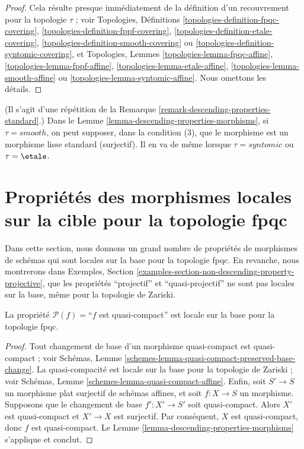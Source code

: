 \begin{proof}
Cela résulte presque immédiatement de la définition d'un recouvrement pour
la topologie $\tau$ ; voir Topologies, Définitions
\ref{topologies-definition-fpqc-covering},
\ref{topologies-definition-fppf-covering},
\ref{topologies-definition-etale-covering},
\ref{topologies-definition-smooth-covering} ou
\ref{topologies-definition-syntomic-covering}, et Topologies, Lemmes
\ref{topologies-lemma-fpqc-affine},
\ref{topologies-lemma-fppf-affine},
\ref{topologies-lemma-etale-affine},
\ref{topologies-lemma-smooth-affine} ou
\ref{topologies-lemma-syntomic-affine}. Nous omettons les détails.
\end{proof}

\begin{remark}
\label{remark-descending-properties-morphisms-standard}
(Il s'agit d'une répétition de la Remarque
\ref{remark-descending-properties-standard}.) Dans le
Lemme \ref{lemma-descending-properties-morphisms}, si $\tau = smooth$, on
peut supposer, dans la condition (3), que le morphisme est un morphisme lisse
standard (surjectif). Il en va de même lorsque $\tau = syntomic$ ou
$\tau = \etale$.
\end{remark}




\section{Propriétés des morphismes locales sur la cible pour la topologie fpqc}
\label{section-descending-properties-morphisms-fpqc}

\noindent
Dans cette section, nous donnons un grand nombre de propriétés de morphismes
de schémas qui sont locales sur la base pour la topologie fpqc. En revanche,
nous montrerons dans Exemples, Section
\ref{examples-section-non-descending-property-projective}, que les propriétés
``projectif'' et ``quasi-projectif'' ne sont pas locales sur la base, même
pour la topologie de Zariski.

\begin{lemma}
\label{lemma-descending-property-quasi-compact}
La propriété $\mathcal{P}(f) =$``$f$ est quasi-compact'' est locale sur la
base pour la topologie fpqc.
\end{lemma}

\begin{proof}
Tout changement de base d'un morphisme quasi-compact est quasi-compact ; voir
Schémas, Lemme \ref{schemes-lemma-quasi-compact-preserved-base-change}.
La quasi-compacité est locale sur la base pour la topologie de Zariski ; voir
Schémas, Lemme \ref{schemes-lemma-quasi-compact-affine}. Enfin, soit
$S' \to S$ un morphisme plat surjectif de schémas affines, et soit
$f : X \to S$ un morphisme. Supposons que le changement de base
$f' : X' \to S'$ soit quasi-compact. Alors $X'$ est quasi-compact et
$X' \to X$ est surjectif. Par conséquent, $X$ est quasi-compact, donc $f$
est quasi-compact. Le Lemme \ref{lemma-descending-properties-morphisms}
s'applique et conclut.
\end{proof}

